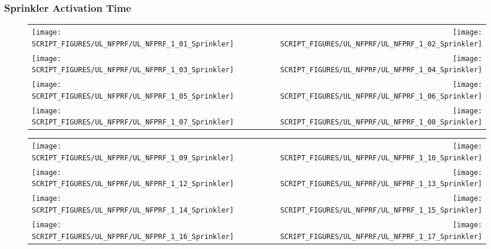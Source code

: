 \clearpage

\subsubsection{Sprinkler Activation Time}

\begin{figure}[p]
\begin{tabular*}{\textwidth}{l@{\extracolsep{\fill}}r}
\texttt{[image: SCRIPT\_FIGURES/UL\_NFPRF/UL\_NFPRF\_1\_01\_Sprinkler]} &
\texttt{[image: SCRIPT\_FIGURES/UL\_NFPRF/UL\_NFPRF\_1\_02\_Sprinkler]} \\
\texttt{[image: SCRIPT\_FIGURES/UL\_NFPRF/UL\_NFPRF\_1\_03\_Sprinkler]} &
\texttt{[image: SCRIPT\_FIGURES/UL\_NFPRF/UL\_NFPRF\_1\_04\_Sprinkler]} \\
\texttt{[image: SCRIPT\_FIGURES/UL\_NFPRF/UL\_NFPRF\_1\_05\_Sprinkler]} &
\texttt{[image: SCRIPT\_FIGURES/UL\_NFPRF/UL\_NFPRF\_1\_06\_Sprinkler]} \\
\texttt{[image: SCRIPT\_FIGURES/UL\_NFPRF/UL\_NFPRF\_1\_07\_Sprinkler]} &
\texttt{[image: SCRIPT\_FIGURES/UL\_NFPRF/UL\_NFPRF\_1\_08\_Sprinkler]}
\end{tabular*}
\end{figure}

\begin{figure}[p]
\begin{tabular*}{\textwidth}{l@{\extracolsep{\fill}}r}
\texttt{[image: SCRIPT\_FIGURES/UL\_NFPRF/UL\_NFPRF\_1\_09\_Sprinkler]} &
\texttt{[image: SCRIPT\_FIGURES/UL\_NFPRF/UL\_NFPRF\_1\_10\_Sprinkler]} \\
\texttt{[image: SCRIPT\_FIGURES/UL\_NFPRF/UL\_NFPRF\_1\_12\_Sprinkler]} &
\texttt{[image: SCRIPT\_FIGURES/UL\_NFPRF/UL\_NFPRF\_1\_13\_Sprinkler]} \\
\texttt{[image: SCRIPT\_FIGURES/UL\_NFPRF/UL\_NFPRF\_1\_14\_Sprinkler]} &
\texttt{[image: SCRIPT\_FIGURES/UL\_NFPRF/UL\_NFPRF\_1\_15\_Sprinkler]} \\
\texttt{[image: SCRIPT\_FIGURES/UL\_NFPRF/UL\_NFPRF\_1\_16\_Sprinkler]} &
\texttt{[image: SCRIPT\_FIGURES/UL\_NFPRF/UL\_NFPRF\_1\_17\_Sprinkler]}
\end{tabular*}
\end{figure}

